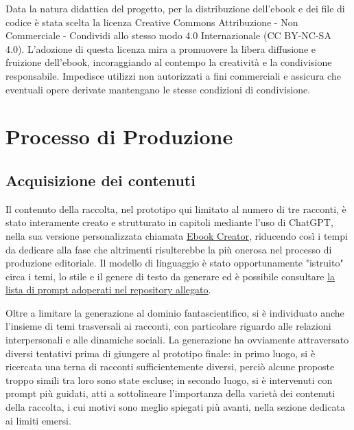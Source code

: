 \documentclass[a4paper,12pt]{article}
\begin{document}
\bigbreak

Data la natura didattica del progetto, per la distribuzione dell'ebook e dei file di codice è stata scelta la licenza Creative Commons Attribuzione - Non Commerciale - Condividi allo stesso modo 4.0 Internazionale (CC BY-NC-SA 4.0). L'adozione di questa licenza mira a promuovere la libera diffusione e fruizione dell'ebook, incoraggiando al contempo la creatività e la condivisione responsabile. Impedisce utilizzi non autorizzati a fini commerciali e assicura che eventuali opere derivate mantengano le stesse condizioni di condivisione.

\section*{Processo di Produzione}
\subsection*{Acquisizione dei contenuti}

Il contenuto della raccolta, nel prototipo qui limitato al numero di tre racconti, è stato interamente creato e strutturato in capitoli mediante l'uso di ChatGPT, nella sua versione personalizzata chiamata \href{https://chatgpt.com/g/g-RVUmJ1eso-ebook-creator}{\underline{Ebook Creator}}, riducendo così i tempi da dedicare alla fase che altrimenti risulterebbe la più onerosa nel processo di produzione editoriale. Il modello di linguaggio è stato opportunamente "istruito" circa i temi, lo stile e il genere di testo da generare ed è possibile consultare \href{https://github.com/gianlucapironato/editoria_digitale/blob/main/prompt%20acquisizione%20contenuti.md}{\underline{la lista di prompt adoperati nel repository allegato}}.

\bigbreak

Oltre a limitare la generazione al dominio fantascientifico, si è individuato anche l'insieme di temi trasversali ai racconti, con particolare riguardo alle relazioni interpersonali e alle dinamiche sociali. La generazione ha ovviamente attraversato diversi tentativi prima di giungere al prototipo finale: in primo luogo, si è ricercata una terna di racconti sufficientemente diversi, perciò alcune proposte troppo simili tra loro sono state escluse; in secondo luogo, si è intervenuti con prompt più guidati, atti a sottolineare l'importanza della varietà dei contenuti della raccolta, i cui motivi sono meglio spiegati più avanti, nella sezione dedicata ai limiti emersi.
\end{document}
